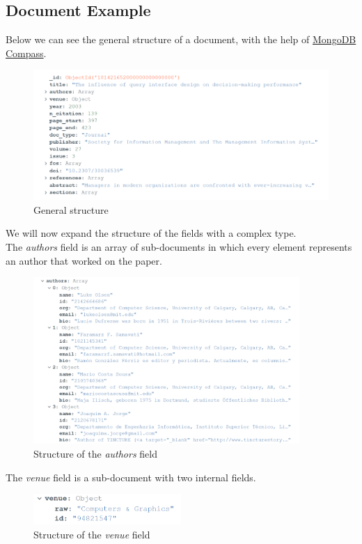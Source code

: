\documentclass{Configuration_Files/PoliMi3i_thesis}
\begin{document}
\subsection{Document Example}
Below we can see the general structure of a document, with the help of \href{https://www.mongodb.com/products/compass}{MongoDB Compass}.
 \begin{figure}[H]
    \centering
    \includegraphics[width=\textwidth]{Images/data/mongodb/doc_general.png}
    \caption{General structure}
\end{figure}

\pagebreak
We will now expand the structure of the fields with a complex type. \\
The \textit{authors} field is an array of sub-documents in which every element represents an author that worked on the paper.
 \begin{figure}[H]
    \centering
    \includegraphics[width=0.9\textwidth]{Images/data/doc_authors.png}
    \caption{Structure of the \textit{authors} field}
\end{figure}

The \textit{venue} field is a sub-document with two internal fields.
 \begin{figure}[H]
    \centering
    \includegraphics[width=0.5\textwidth]{Images/data/doc_venue.png}
    \caption{Structure of the \textit{venue} field}
\end{figure}
\end{document}
